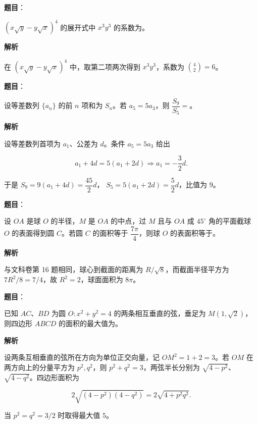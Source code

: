 \begin{answer}

\textbf{题目}：

$(x\sqrt y-y\sqrt x)^4$ 的展开式中 $x^3y^3$ 的系数为\gkblank{}。

\textbf{解析}

在 $(x\sqrt y-y\sqrt x)^4$ 中，取第二项两次得到
$x^3y^3$，系数为 $\binom42=6$。


\end{answer}
\begin{answer}

\textbf{题目}：

设等差数列 $\{a_n\}$ 的前 $n$ 项和为 $S_n$。若 $a_5=5a_3$，则 $\dfrac{S_9}{S_5}=$\gkblank{}。

\textbf{解析}

设等差数列首项为 $a_1$、公差为 $d$。条件
$a_5=5a_3$ 给出

\nopagebreak[4]
\[
a_1+4d=5(a_1+2d)\Longrightarrow a_1=-\frac32d.
\]

于是 $S_9=9(a_1+4d)=\dfrac{45}{2}d$，
$S_5=5(a_1+2d)=\dfrac52d$，比值为 $9$。


\end{answer}
\begin{answer}

\textbf{题目}：

设 $OA$ 是球 $O$ 的半径，$M$ 是 $OA$ 的中点，过 $M$ 且与 $OA$ 成 $45^\circ$ 角的平面截球 $O$ 的表面得到圆 $C$。若圆 $C$ 的面积等于 $\dfrac{7\pi}{4}$，则球 $O$ 的表面积等于\gkblank{}。

\textbf{解析}

与文科卷第 16 题相同，球心到截面的距离为 $R/\sqrt8$，而截面半径平方为
$7R^2/8=7/4$，故 $R^2=2$，球面面积为 $8\pi$。


\end{answer}
\begin{answer}

\textbf{题目}：

已知 $AC\text{、}BD$ 为圆 $O:x^2+y^2=4$ 的两条相互垂直的弦，垂足为 $M(1,\sqrt2)$，则四边形 $ABCD$ 的面积的最大值为\gkblank{}。

\textbf{解析}

设两条互相垂直的弦所在方向为单位正交向量，记
$OM^2=1+2=3$。若 $OM$ 在两方向上的分量平方为
$p^2,q^2$，则 $p^2+q^2=3$，两弦半长分别为
$\sqrt{4-p^2}$、$\sqrt{4-q^2}$。四边形面积为

\nopagebreak[4]
\[
2\sqrt{(4-p^2)(4-q^2)}
=2\sqrt{4+p^2q^2}.
\]

当 $p^2=q^2=3/2$ 时取得最大值 $5$。


\end{answer}
